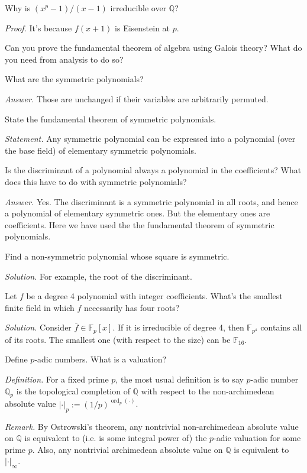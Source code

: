 \documentclass{mathproblems}
\newcommand\F{\mathbb{F}}
\newcommand\Q{\mathbb{Q}}
\begin{document}
\begin{questions}
\miquestion
{\color{blue} Why is $(x^{p}-1)/(x-1)$ irreducible over $\Q$?}

\textit{Proof.}
It's because $f(x+1)$ is Eisenstein at $p$.

\miquestion
{\color{red} Can you prove the fundamental theorem of algebra using Galois theory? What do you need from analysis to do so?}

\miquestion
{\color{blue} What are the symmetric polynomials?}

\textit{Answer.} Those are unchanged if their variables are arbitrarily permuted.

\miquestion
{\color{blue} State the fundamental theorem of symmetric polynomials.}

\textit{Statement.} Any symmetric polynomial can be expressed into a polynomial (over the base field) of elementary symmetric polynomials.

\miquestion
{\color{blue} Is the discriminant of a polynomial always a polynomial in the coefficients? What does this have to do with symmetric polynomials?}

\textit{Answer.} Yes. The discriminant is a symmetric polynomial in all roots, and hence a polynomial of elementary symmetric ones. But the elementary ones are coefficients. Here we have used the the fundamental theorem of symmetric polynomials.

\miquestion
{\color{blue} Find a non-symmetric polynomial whose square is symmetric.}

\textit{Solution.} For example, the root of the discriminant.

\miquestion
{\color{blue} Let $f$ be a degree 4 polynomial with integer coefficients. What's the smallest finite field in which $f$ necessarily has four roots?}

\textit{Solution.} Consider $\overline{f}\in \F_p[x]$. If it is irreducible of degree 4, then $\F_{p^4}$ contains all of its roots. The smallest one (with respect to the size) can be $\F_{16}$.

\miquestion
{\color{blue} Define $p$-adic numbers. What is a valuation?}

\textit{Definition.} For a fixed prime $p$, the most usual definition is to say $p$-adic number $\Q_p$ is the topological completion of $\Q$ with respect to the non-archimedean absolute value $|\cdot|_p:=(1/p)^{\operatorname{ord}_p(\cdot)}$.

\textit{Remark.} By Ostrowski's theorem, any nontrivial non-archimedean absolute value on $\Q$ is equivalent to (i.e. is some integral power of) the $p$-adic valuation for some prime $p$. Also, any nontrivial archimedean absolute value on $\Q$ is equivalent to $|\cdot|_\infty$.


\end{questions}
\end{document}

